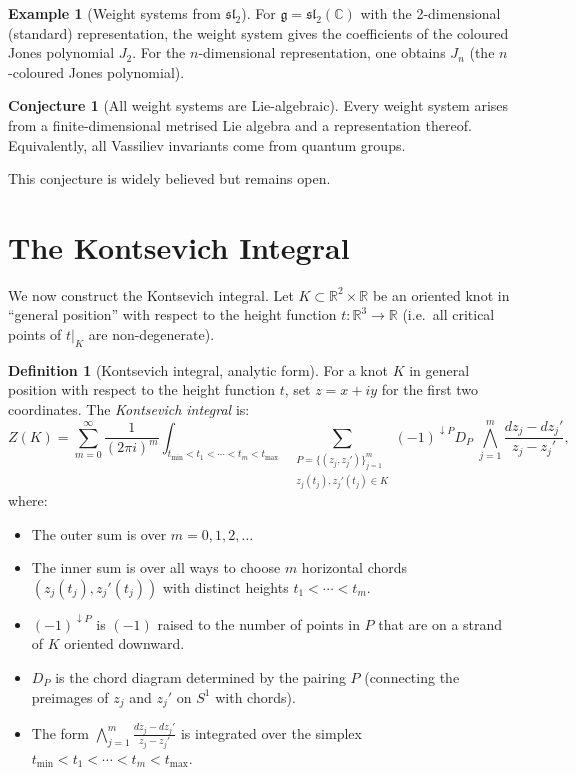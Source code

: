 \documentclass[12pt,a4paper]{amsart}
\theoremstyle{definition}
\newtheorem{definition}[theorem]{Definition}
\newtheorem{example}[theorem]{Example}
\newtheorem{conjecture}[theorem]{Conjecture}
\newcommand{\R}{\mathbb{R}}
\newcommand{\C}{\mathbb{C}}
\begin{document}
\begin{example}[Weight systems from $\mathfrak{sl}_2$]
For $\mathfrak{g} = \mathfrak{sl}_2(\C)$ with the 2-dimensional (standard)
representation, the weight system gives the coefficients of the coloured
Jones polynomial $J_2$.  For the $n$-dimensional representation, one obtains
$J_n$ (the $n$-coloured Jones polynomial).
\end{example}

\begin{conjecture}[All weight systems are Lie-algebraic]\label{conj:all_lie}
Every weight system arises from a finite-dimensional metrised Lie algebra
and a representation thereof.  Equivalently, all Vassiliev invariants come
from quantum groups.
\end{conjecture}

This conjecture is widely believed but remains open.

\section{The Kontsevich Integral}\label{sec:KI}

We now construct the Kontsevich integral.  Let $K \subset \R^2 \times \R$
be an oriented knot in ``general position'' with respect to the height
function $t: \R^3 \to \R$ (i.e.\ all critical points of $t|_K$ are
non-degenerate).

\begin{definition}[Kontsevich integral, analytic form]\label{def:KI}
For a knot $K$ in general position with respect to the height function $t$,
set $z = x + iy$ for the first two coordinates.  The \emph{Kontsevich integral}
is:
\[
  Z(K) = \sum_{m=0}^\infty \frac{1}{(2\pi i)^m}
  \int_{t_{\min} < t_1 < \cdots < t_m < t_{\max}}
  \sum_{\substack{P = \{(z_j, z_j')\}_{j=1}^m \\ z_j(t_j), z_j'(t_j) \in K}}
  (-1)^{\downarrow P} D_P \; \bigwedge_{j=1}^m \frac{d z_j - d z_j'}{z_j - z_j'},
\]
where:
\begin{itemize}
  \item The outer sum is over $m = 0, 1, 2, \ldots$
  \item The inner sum is over all ways to choose $m$ horizontal chords
        $(z_j(t_j), z_j'(t_j))$ with distinct heights $t_1 < \cdots < t_m$.
  \item $(-1)^{\downarrow P}$ is $(-1)$ raised to the number of points in
        $P$ that are on a strand of $K$ oriented downward.
  \item $D_P$ is the chord diagram determined by the pairing $P$ (connecting
        the preimages of $z_j$ and $z_j'$ on $S^1$ with chords).
  \item The form $\bigwedge_{j=1}^m \frac{dz_j - dz_j'}{z_j - z_j'}$ is
        integrated over the simplex
        $t_{\min} < t_1 < \cdots < t_m < t_{\max}$.
\end{itemize}
\end{definition}
\end{document}
